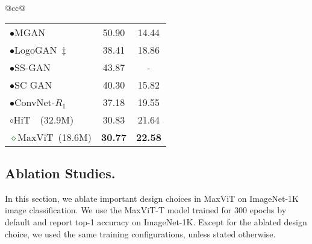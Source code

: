 \documentclass[runningheads]{llncs}
\begin{document}
\begin{table*}[!t]
\begin{tabular}{@{}cc@{}}
\begin{minipage}[t]{0.4\textwidth}
\begin{tabular}{l|cc}
\textcolor{blueish}{$\bullet$}MGAN~\cite{hoang2018mgan}  & 50.90 & 14.44 \\
\textcolor{blueish}{$\bullet$}LogoGAN~\cite{sage2018logo}$\ddagger$  & 38.41 & 18.86 \\
\textcolor{blueish}{$\bullet$}SS-GAN~\cite{chen2019self}  & 43.87 & - \\
\textcolor{blueish}{$\bullet$}SC GAN~\cite{liu2020diverse}  & 40.30 & 15.82  \\
\textcolor{blueish}{$\bullet$}ConvNet-$R_1$~\cite{zhao2021improved} & 37.18 & 19.55 \\ \hline
\textcolor{brickred}{$\circ$}HiT~\cite{zhao2021improved}~(32.9M) & 30.83 & 21.64 \\\hline
\textcolor{darkgreen}{$\diamond$}MaxViT~(18.6M) & \textbf{30.77} & \textbf{22.58} \\
\end{tabular}
\end{minipage}\end{tabular}
\end{table*}








\subsection{Ablation Studies.}

In this section, we ablate important design choices in MaxViT on ImageNet-1K image classification. We use the MaxViT-T model trained for 300 epochs by default and report top-1 accuracy on ImageNet-1K. Except for the ablated design choice, we used the same training configurations, unless stated otherwise.
\end{document}
